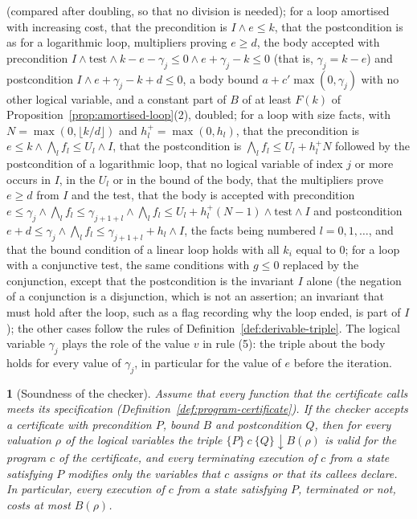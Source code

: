 \documentclass[oneside,english]{amsart}
\numberwithin{equation}{section}
\numberwithin{figure}{section}
\theoremstyle{plain}
\newtheorem{thm}{\protect\theoremname}
\theoremstyle{definition}
\theoremstyle{plain}
\theoremstyle{remark}
\theoremstyle{plain}
\theoremstyle{definition}
\theoremstyle{plain}
\theoremstyle{remark}
\providecommand{\theoremname}{Theorem}
\begin{document}
(compared after doubling, so that no division is needed); for a loop amortised with increasing cost, that the precondition is $I \wedge e \le k$, that the postcondition is as for a logarithmic loop, multipliers proving $e \ge d$, the body accepted with precondition $I \wedge \text{test} \wedge k - e - \gamma_j \le 0 \wedge e + \gamma_j - k \le 0$ (that is, $\gamma_j = k - e$) and postcondition $I \wedge e + \gamma_j - k + d \le 0$, a body bound $a + c' \max(0, \gamma_j)$ with no other logical variable, and a constant part of $B$ of at least $F(k)$ of Proposition~\ref{prop:amortised-loop}(2), doubled; for a loop with size facts, with $N = \max(0, \lfloor k/d \rfloor)$ and $h_l^+ = \max(0, h_l)$, that the precondition is $e \le k \wedge \bigwedge_l f_l \le U_l \wedge I$, that the postcondition is $\bigwedge_l f_l \le U_l + h_l^+ N$ followed by the postcondition of a logarithmic loop, that no logical variable of index $j$ or more occurs in $I$, in the $U_l$ or in the bound of the body, that the multipliers prove $e \ge d$ from $I$ and the test, that the body is accepted with precondition $e \le \gamma_j \wedge \bigwedge_l f_l \le \gamma_{j+1+l} \wedge \bigwedge_l f_l \le U_l + h_l^+ (N - 1) \wedge \text{test} \wedge I$ and postcondition $e + d \le \gamma_j \wedge \bigwedge_l f_l \le \gamma_{j+1+l} + h_l \wedge I$, the facts being numbered $l = 0, 1, \dots$, and that the bound condition of a linear loop holds with all $k_i$ equal to $0$; for a loop with a conjunctive test, the same conditions with $g \le 0$ replaced by the conjunction, except that the postcondition is the invariant $I$ alone (the negation of a conjunction is a disjunction, which is not an assertion; an invariant that must hold after the loop, such as a flag recording why the loop ended, is part of $I$); the other cases follow the rules of Definition~\ref{def:derivable-triple}. The logical variable $\gamma_j$ plays the role of the value $v$ in rule (5): the triple about the body holds for every value of $\gamma_j$, in particular for the value of $e$ before the iteration.

\begin{thm}[Soundness of the checker]
\label{thm:checker-soundness}
Assume that every function that the certificate calls meets its specification (Definition~\ref{def:program-certificate}). If the checker accepts a certificate with precondition $P$, bound $B$ and postcondition $Q$, then for every valuation $\rho$ of the logical variables the triple $\{P\}\ c\ \{Q\}\!\downarrow\! B(\rho)$ is valid for the program $c$ of the certificate, and every terminating execution of $c$ from a state satisfying $P$ modifies only the variables that $c$ assigns or that its callees declare. In particular, every execution of $c$ from a state satisfying $P$, terminated or not, costs at most $B(\rho)$.
\end{thm}
\end{document}
